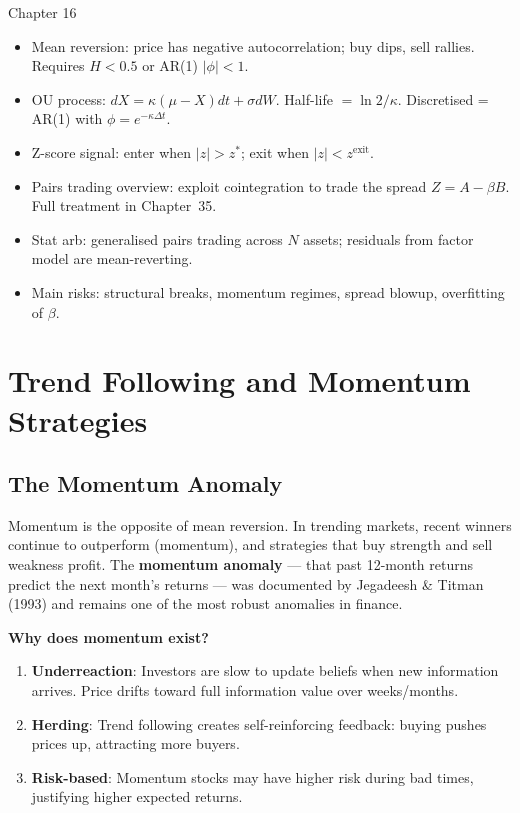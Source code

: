\documentclass[12pt,a4paper,openany]{report}
\theoremstyle{definition}
\begin{document}
\begin{takeawaybox}{Chapter 16}
\begin{itemize}
  \item Mean reversion: price has negative autocorrelation; buy dips, sell rallies. Requires $H < 0.5$ or AR(1) $|\phi| < 1$.
  \item OU process: $dX = \kappa(\mu - X)dt + \sigma dW$. Half-life $= \ln2/\kappa$. Discretised = AR(1) with $\phi = e^{-\kappa\Delta t}$.
  \item Z-score signal: enter when $|z| > z^*$; exit when $|z| < z^{\text{exit}}$.
  \item Pairs trading overview: exploit cointegration to trade the spread $Z = A - \beta B$. Full treatment in Chapter~35.
  \item Stat arb: generalised pairs trading across $N$ assets; residuals from factor model are mean-reverting.
  \item Main risks: structural breaks, momentum regimes, spread blowup, overfitting of $\beta$.
\end{itemize}
\end{takeawaybox}


\chapter{Trend Following and Momentum Strategies}

\section{The Momentum Anomaly}

Momentum is the opposite of mean reversion. In trending markets, recent winners continue to outperform (momentum), and strategies that buy strength and sell weakness profit. The \textbf{momentum anomaly} — that past 12-month returns predict the next month's returns — was documented by Jegadeesh \& Titman (1993) and remains one of the most robust anomalies in finance.

\textbf{Why does momentum exist?}
\begin{enumerate}[label=\arabic*.]
  \item \textbf{Underreaction}: Investors are slow to update beliefs when new information arrives. Price drifts toward full information value over weeks/months.
  \item \textbf{Herding}: Trend following creates self-reinforcing feedback: buying pushes prices up, attracting more buyers.
  \item \textbf{Risk-based}: Momentum stocks may have higher risk during bad times, justifying higher expected returns.
\end{enumerate}
\end{document}
